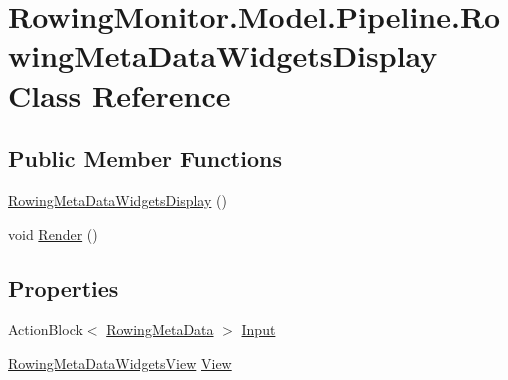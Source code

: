 \hypertarget{class_rowing_monitor_1_1_model_1_1_pipeline_1_1_rowing_meta_data_widgets_display}{}\section{Rowing\+Monitor.\+Model.\+Pipeline.\+Rowing\+Meta\+Data\+Widgets\+Display Class Reference}
\label{class_rowing_monitor_1_1_model_1_1_pipeline_1_1_rowing_meta_data_widgets_display}
\subsection*{Public Member Functions}
\begin{DoxyCompactItemize}
\item 
\hyperlink{class_rowing_monitor_1_1_model_1_1_pipeline_1_1_rowing_meta_data_widgets_display_a7ed8966ffb6bb02591cfa8f770ebb979}{Rowing\+Meta\+Data\+Widgets\+Display} ()
\item 
void \hyperlink{class_rowing_monitor_1_1_model_1_1_pipeline_1_1_rowing_meta_data_widgets_display_a09e7f318f293d98ad7d18949aea1f47a}{Render} ()
\end{DoxyCompactItemize}
\subsection*{Properties}
\begin{DoxyCompactItemize}
\item 
Action\+Block$<$ \hyperlink{struct_rowing_monitor_1_1_model_1_1_util_1_1_rowing_meta_data}{Rowing\+Meta\+Data} $>$ \hyperlink{class_rowing_monitor_1_1_model_1_1_pipeline_1_1_rowing_meta_data_widgets_display_a283a70144d7d3d3c495d3fd987410bc8}{Input}
\item 
\hyperlink{class_rowing_monitor_1_1_view_1_1_rowing_meta_data_widgets_view}{Rowing\+Meta\+Data\+Widgets\+View} \hyperlink{class_rowing_monitor_1_1_model_1_1_pipeline_1_1_rowing_meta_data_widgets_display_ab88d3d1b60306b8e0b02df376f613d07}{View}
\end{DoxyCompactItemize}


